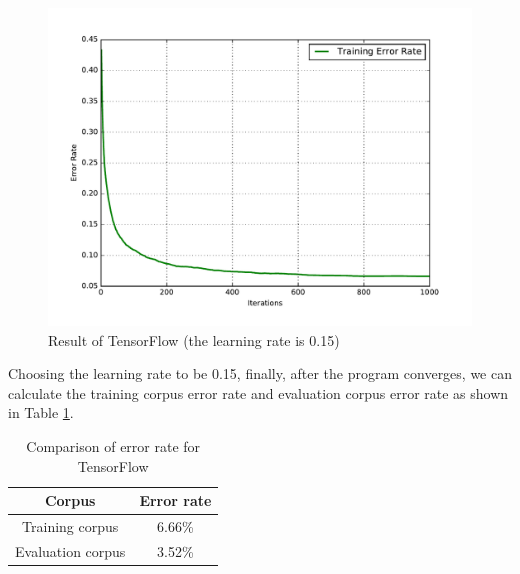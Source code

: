 \begin{figure}[H]
\centering
\includegraphics[width=1.0\textwidth]{./figures/tensorflow.pdf}
\caption{\label{fig:tensorflow} Result of TensorFlow (the learning rate is 0.15)}
\end{figure}

Choosing the learning rate to be 0.15, finally, after the program converges, we can calculate the training corpus error rate and evaluation corpus error rate as shown in Table \ref{table:tensorflow-error}.

\begin{table}[H]
	\centering
	\caption{\label{table:tensorflow-error} Comparison of error rate for TensorFlow}
	\begin{tabular}{c | c}
		\hline \hline
		Corpus  			&	Error rate \\[0.1cm]
		\hline
		Training corpus		&	6.66\%	\\[0.1cm]
		Evaluation corpus	&	3.52\%	\\[0.1cm]
		\hline	
	\end{tabular}\\
\end{table}






\clearpage

%
%
%



